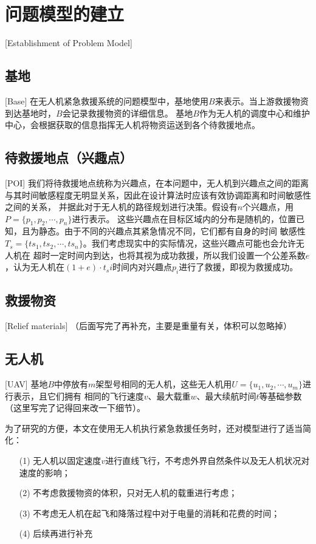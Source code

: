 \section{问题模型的建立}[Establishment of Problem Model]

\subsection{基地}[Base]
在无人机紧急救援系统的问题模型中，基地使用$B$来表示。当上游救援物资到达基地时，$B$会记录救援物资的详细信息。
基地$B$作为无人机的调度中心和维护中心，会根据获取的信息指挥无人机将物资运送到各个待救援地点。
\subsection{待救援地点（兴趣点）}[POI]
我们将待救援地点统称为兴趣点，在本问题中，无人机到兴趣点之间的距离与其时间敏感程度无明显关系，因此在设计算法时应该有效协调距离和时间敏感性之间的关系，
并据此对于无人机的路径规划进行决策。假设有$n$个兴趣点，用$P=\lbrace p_1, p_2, \cdots ,p_n \rbrace$进行表示。
这些兴趣点在目标区域内的分布是随机的，位置已知，且为静态。由于不同的兴趣点其紧急情况不同，它们都有自身的时间
敏感性$T_s=\lbrace ts_1, ts_2, \cdots ,ts_n \rbrace$。我们考虑现实中的实际情况，这些兴趣点可能也会允许无人机在
超时一定时间内到达，也将其视为成功救援，所以我们设置一个公差系数$e$，认为无人机在$(1+e) \cdot t_si$时间内对兴趣点$p_i$进行了救援，即视为救援成功。
\subsection{救援物资}[Relief materials]
（后面写完了再补充，主要是重量有关，体积可以忽略掉）
\subsection{无人机}[UAV]
基地$B$中停放有$m$架型号相同的无人机，这些无人机用$U=\lbrace u_1, u_2, \cdots ,u_m \rbrace$进行表示，且它们拥有
相同的飞行速度$v$、最大载重$w$、最大续航时间$t$等基础参数（这里写完了记得回来改一下细节）。


为了研究的方便，本文在使用无人机执行紧急救援任务时，还对模型进行了适当简化：
\begin{itemize}
	\item [(1)] 无人机以固定速度$v$进行直线飞行，不考虑外界自然条件以及无人机状况对速度的影响；
 	\item [(2)] 不考虑救援物资的体积，只对无人机的载重进行考虑；
  	\item [(3)] 不考虑无人机在起飞和降落过程中对于电量的消耗和花费的时间；
    \item [(4)] 后续再进行补充
\end{itemize}
